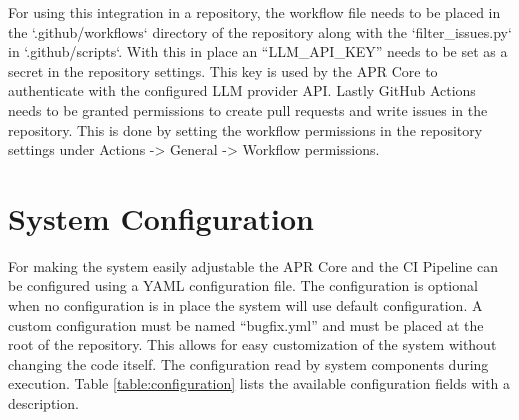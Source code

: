 For using this integration in a repository, the workflow file needs to be placed in the `.github/workflows` directory of the repository along with the `filter\_issues.py` in `.github/scripts`. With this in place an ``LLM\_API\_KEY'' needs to be set as a secret in the repository settings. This key is used by the APR Core to authenticate with the configured LLM provider API. Lastly GitHub Actions needs to be granted permissions to create pull requests and write issues in the repository. This is done by setting the workflow permissions in the repository settings under Actions -> General -> Workflow permissions.

\section{System Configuration}
For making the system easily adjustable the APR Core and the CI Pipeline can be configured using a YAML configuration file. The configuration is optional when no configuration is in place the system will use default configuration. A custom configuration must be named ``bugfix.yml'' and must be placed at the root of the repository. This allows for easy customization of the system without changing the code itself. The configuration read by system components during execution. Table \ref{table:configuration} lists the available configuration fields with a  description.


